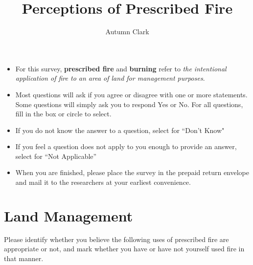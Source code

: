 \documentclass[
  english,
  checkmode = fill,
  ]{sdapsclassic}
\author{Autumn Clark}
\title{Perceptions of Prescribed Fire}
\begin{document}
 
  \begin{questionnaire}

    \begin{info}
\begin{itemize}
     \item For this survey, \textbf{prescribed fire} and \textbf{burning} refer to \emph{the intentional application of fire to an area of land for management purposes}.
      \item Most questions will ask if you agree or disagree with one or more statements. 
	     Some questions will simply ask you to respond Yes or No. 
	    For all questions, fill in the box or circle to select. 
      \item If you do not know the answer to a question, select {} for ``Don't Know"
      \item If you feel a question does not apply to you enough to provide an answer, select  for ``Not Applicable''
      \item When you are finished, please place the survey in the prepaid return envelope and mail it to the researchers at your earliest convenience.
\end{itemize}
    \end{info}


    \section{Land Management}

    \begin{choicegroup}[rowsep=0.25em]{Please identify whether you believe the following uses of prescribed fire are appropriate or not, and mark whether you have or have not yourself used fire in that manner.}
      
      
    \end{choicegroup}


\end{questionnaire}
\end{document}
